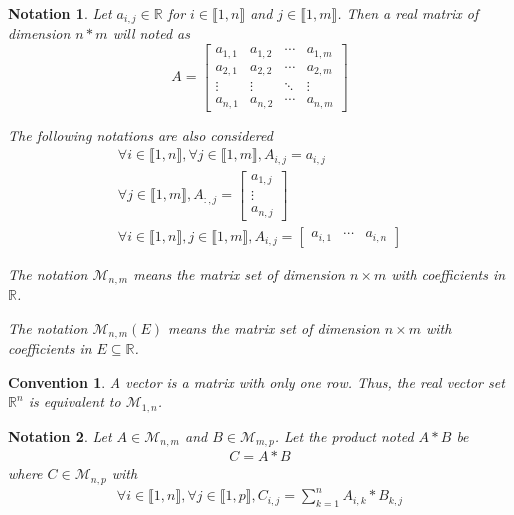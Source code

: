 \documentclass[11pt,en]{elegantpaper}
\newtheorem{convention}{Convention}
\newtheorem{notation}{Notation}
\begin{document}
\begin{notation}
  Let $a_{i,j} \in \mathbb{R}$ for $i \in \llbracket 1,n \rrbracket$ and $j \in \llbracket 1,m \rrbracket$.
  Then a real matrix of dimension $n * m$ will noted as \begin{equation*}
    A = \begin{bmatrix}
      a_{1,1} & a_{1,2} & \cdots & a_{1,m} \\
      a_{2,1} & a_{2,2} & \cdots & a_{2,m} \\
      \vdots & \vdots & \ddots & \vdots \\
      a_{n,1} & a_{n,2} & \cdots & a_{n,m}
    \end{bmatrix}
  \end{equation*}

  The following notations are also considered \begin{gather*}
    \forall i \in \llbracket 1,n \rrbracket, \forall j \in \llbracket 1,m \rrbracket, A_{i,j} = a_{i,j} \\
    \forall j \in \llbracket 1,m \rrbracket, A_{:,j} = \begin{bmatrix}
      a_{1,j} \\
      \vdots \\
      a_{n,j}
    \end{bmatrix} \\
    \forall i \in \llbracket 1,n \rrbracket, j \in \llbracket 1,m \rrbracket, A_{i,j} = \begin{bmatrix}
      a_{i,1} & \cdots & a_{i,n}
    \end{bmatrix}
  \end{gather*}

  The notation $\mathcal{M}_{n,m}$ means the matrix set of dimension $n \times m$ with coefficients in $\mathbb{R}$. \par
  The notation $\mathcal{M}_{n,m}(E)$ means the matrix set of dimension $n \times m$ with coefficients in $E \subseteq \mathbb{R}$.
\end{notation}

\begin{convention}
  A vector is a matrix with only one row. Thus, the real vector set $\mathbb{R}^n$ is equivalent to $\mathcal{M}_{1,n}$.
\end{convention}

\begin{notation}
  Let $A \in \mathcal{M}_{n,m}$ and $B \in \mathcal{M}_{m,p}$. Let the product noted $A * B$ be \begin{gather*}
    C = A * B
  \end{gather*}
  where $C \in \mathcal{M}_{n,p}$ with \begin{gather*}
    \forall i \in \llbracket 1,n \rrbracket, \forall j \in \llbracket 1,p \rrbracket, C_{i,j} = \sum_{k=1}^n A_{i,k} * B_{k,j}
  \end{gather*}

\end{notation}
\end{document}
